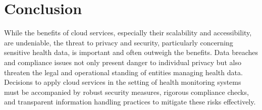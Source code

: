 \section{Conclusion} While the benefits of cloud services, especially their
scalability and accessibility, are undeniable, the threat to privacy and
security, particularly concerning sensitive health data, is important and often
outweigh the benefits. Data breaches and compliance issues not only present
danger to individual privacy but also threaten the legal and operational
standing of entities managing health data. Decisions to apply cloud services in
the setting of health monitoring systems must be accompanied by robust security
measures, rigorous compliance checks, and transparent information handling
practices to mitigate these risks effectively.